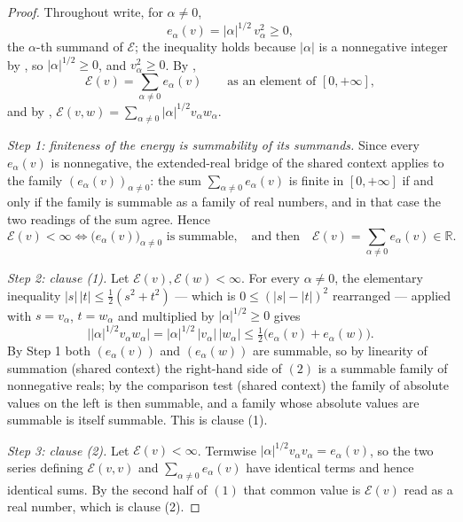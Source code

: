\begin{proof}
Throughout write, for $\alpha \neq 0$,
\[
  e_\alpha(v) = |\alpha|^{1/2}\,v_\alpha^2 \geq 0 ,
\]
the $\alpha$-th summand of $\mathcal{E}$; the inequality holds because
$|\alpha|$ is a nonnegative integer by , so
$|\alpha|^{1/2} \geq 0$, and $v_\alpha^2 \geq 0$.  By ,
\[
  \mathcal{E}(v) = \sum_{\alpha \neq 0} e_\alpha(v)
  \qquad\text{as an element of } [0,+\infty] ,
\]
and by ,
$\mathcal{E}(v,w) = \sum_{\alpha\neq0} |\alpha|^{1/2} v_\alpha w_\alpha$.

\emph{Step 1: finiteness of the energy is summability of its summands.}
Since every $e_\alpha(v)$ is nonnegative, the extended-real bridge of the shared
context applies to the family $(e_\alpha(v))_{\alpha \neq 0}$: the sum
$\sum_{\alpha\neq0} e_\alpha(v)$ is finite in $[0,+\infty]$ if and only if the
family is summable as a family of real numbers, and in that case the two
readings of the sum agree.  Hence
\begin{equation*}
  \mathcal{E}(v) < \infty
  \iff \bigl(e_\alpha(v)\bigr)_{\alpha\neq0} \text{ is summable},
  \quad\text{and then}\quad
  \mathcal{E}(v) = \sum_{\alpha\neq0} e_\alpha(v) \in \mathbb{R}. \tag{1}
\end{equation*}

\emph{Step 2: clause (1).}
Let $\mathcal{E}(v), \mathcal{E}(w) < \infty$.  For every $\alpha \neq 0$, the
elementary inequality $|s|\,|t| \leq \tfrac12(s^2+t^2)$ --- which is
$0 \leq (|s|-|t|)^2$ rearranged --- applied with $s = v_\alpha$, $t = w_\alpha$
and multiplied by $|\alpha|^{1/2} \geq 0$ gives
\begin{equation*}
  \bigl||\alpha|^{1/2} v_\alpha w_\alpha\bigr|
    = |\alpha|^{1/2}\,|v_\alpha|\,|w_\alpha|
    \leq \tfrac12\bigl(e_\alpha(v) + e_\alpha(w)\bigr). \tag{2}
\end{equation*}
By Step 1 both $(e_\alpha(v))$ and $(e_\alpha(w))$ are summable, so by linearity
of summation (shared context) the right-hand side of $(2)$ is a summable family
of nonnegative reals; by the comparison test (shared context) the family of
absolute values on the left is then summable, and a family whose absolute values
are summable is itself summable.  This is clause (1).

\emph{Step 3: clause (2).}
Let $\mathcal{E}(v) < \infty$.  Termwise
$|\alpha|^{1/2} v_\alpha v_\alpha = e_\alpha(v)$, so the two series defining
$\mathcal{E}(v,v)$ and $\sum_{\alpha\neq0} e_\alpha(v)$ have identical terms and
hence identical sums.  By the second half of $(1)$ that common value is
$\mathcal{E}(v)$ read as a real number, which is clause (2).


\end{proof}
